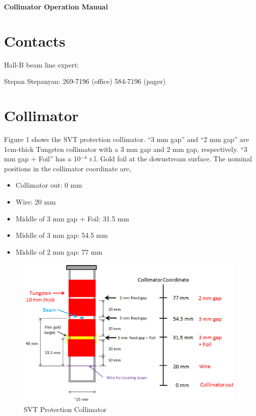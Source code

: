 \documentclass[12pt]{report}
\begin{document}
\begin{center}
{\LARGE\bf Collimator Operation Manual}
\end{center}

\section{\bf Contacts}

\noindent 
Hall-B beam line expert:  

\noindent
Stepan Stepanyan: 269-7196 (office) 584-7196 (pager)

\section{\bf Collimator}

Figure 1 shows the SVT protection collimator. ``3 mm gap'' and ``2 mm gap'' are 1cm-thick Tungsten collimator with a 3 mm gap and 2 mm gap, respectively. ``3 mm gap + Foil'' has a 10$^{-4}$ r.l. Gold foil at the downstream surface. The nominal positions in the collimator coordinate are,

\begin{itemize}
\item
Collimator out:  0 mm
\item
Wire: 20 mm
\item
Middle of 3 mm gap + Foil: 31.5 mm
\item
Middle of 3 mm gap: 54.5 mm
\item
Middle of 2 mm gap: 77 mm
\end{itemize}

\begin{figure}[ht!]
\centering
\includegraphics[width=12cm]{CollimatorLadder.eps}
\caption{SVT Protection Collimator}
\label{collimator}
\end{figure}
\end{document}
